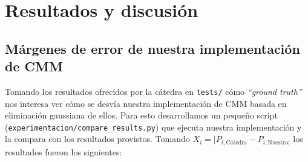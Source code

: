 \documentclass[a4paper]{article}
\begin{document}
\section{Resultados y discusión} \label{sec:resultados}

\subsection{Márgenes de error de nuestra implementación de CMM}
Tomando los resultados ofrecidos por la cátedra en \texttt{tests/} cómo \textit{``ground truth''} nos interesa ver cómo se desvía nuestra implementación de CMM basada en eliminación gaussiana de ellos. Para esto desarrollamos un pequeño script (\texttt{experimentacion/compare\_results.py}) que ejecuta nuestra implementación y la compara con los resultados provistos. Tomando $X_i = |P_{i,\text{Cátedra}} - P_{i,\text{Nuestro}|}$ los resultados fueron los siguientes:
\end{document}
